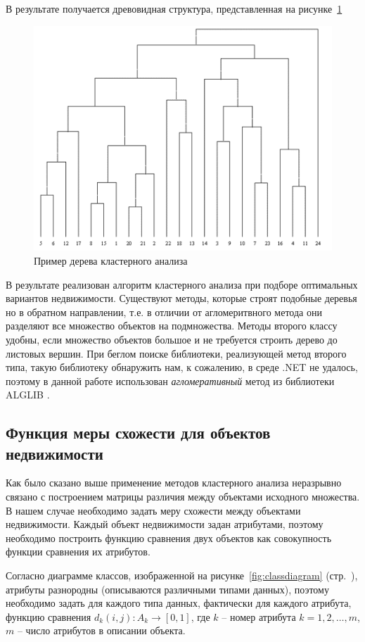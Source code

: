 \documentclass[a4paper,14pt,openany,final]{extreport} %
\def\oldcaption{} \let\oldcaption=\caption
\def\caption{\stepcounter{captionsnum}\oldcaption}
\begin{document}
{В результате получается древовидная структура, представленная на рисунке~\ref{fig:hclusttree}
\begin{figure}[htbp]
  \centering
  \includegraphics[width=0.5\linewidth]{hclustexample.png}
  \caption{Пример дерева кластерного анализа \protect\cite{aicourse}}
  \label{fig:hclusttree}
\end{figure}
В результате реализован алгоритм кластерного анализа при подборе оптимальных вариантов недвижимости. Существуют методы, которые строят подобные деревья но в обратном направлении, т.е. в отличии от агломеритвного метода они разделяют все множество объектов на подмножества.  Методы второго классу удобны, если множество объектов большое и не требуется строить дерево до листовых вершин. При беглом поиске библиотеки, реализующей метод второго типа, такую библиотеку обнаружить нам, к сожалению, в среде .NET не удалось, поэтому в данной работе использован \emph{агломеративный} метод из библиотеки \textsc{ALGLIB} \cite{alglib}. %

\subsection{Функция меры схожести для объектов недвижимости}

Как было сказано выше применение методов кластерного анализа неразрывно связано с построением матрицы различия между объектами исходного множества. В нашем случае необходимо задать меру схожести между объектами недвижимости. Каждый объект недвижимости задан атрибутами, поэтому необходимо построить функцию сравнения двух объектов как совокупность функции сравнения их атрибутов.

Согласно диаграмме классов, изображенной на рисунке~\ref{fig:classdiagram} (стр.~\pageref{fig:classdiagram}), атрибуты разнородны (описываются различными типами данных), поэтому необходимо задать для каждого типа данных, фактически для каждого атрибута, функцию сравнения $d_k(i,j):A_k\to [0,1]$, где $k$ -- номер атрибута $k=1,2,\ldots,m$, $m$ -- число атрибутов в описании объекта.

}
\end{document}
